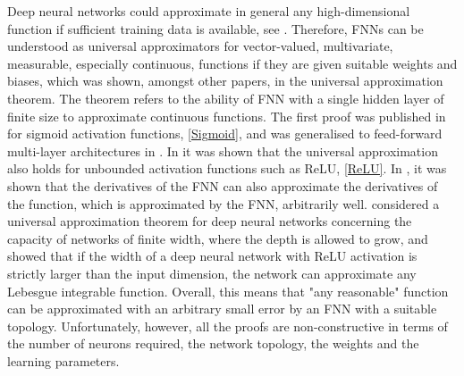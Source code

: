 Deep neural networks could approximate in general any high-dimensional function if sufficient training data is available, see \cite{ArzaniDawson:2021}. Therefore, FNNs can be understood as universal approximators for vector-valued, multivariate, measurable, especially continuous, functions if they are given suitable weights and biases, which was shown, amongst other papers, in the universal approximation theorem. The theorem refers to the ability of FNN with a single hidden layer of finite size to approximate continuous functions. The first proof was published in \cite{Cybenko:1989} for sigmoid activation functions, \cref{Sigmoid}, and was generalised to feed-forward multi-layer architectures in \cite{Hornik:1991}. In \cite{SonodaMurata:2017} it was shown that the universal approximation also holds for unbounded activation functions such as ReLU, \cref{ReLU}. In \cite{HornikStinchcombeWhite:1990}, it was shown that the derivatives of the FNN can also approximate the derivatives of the function, which is approximated by the FNN, arbitrarily well. \cite{LuPuWangHuWang:2017} considered a universal approximation theorem for deep neural networks concerning the capacity of networks of finite width, where the depth is allowed to grow, and showed that if the width of a deep neural network with ReLU activation is strictly larger than the input dimension, the network can approximate any Lebesgue integrable function. Overall, this means that "any reasonable" function can be approximated with an arbitrary small error by an FNN with a suitable topology. Unfortunately, however, all the proofs are non-constructive in terms of the number of neurons required, the network topology, the weights and the learning parameters. \\


